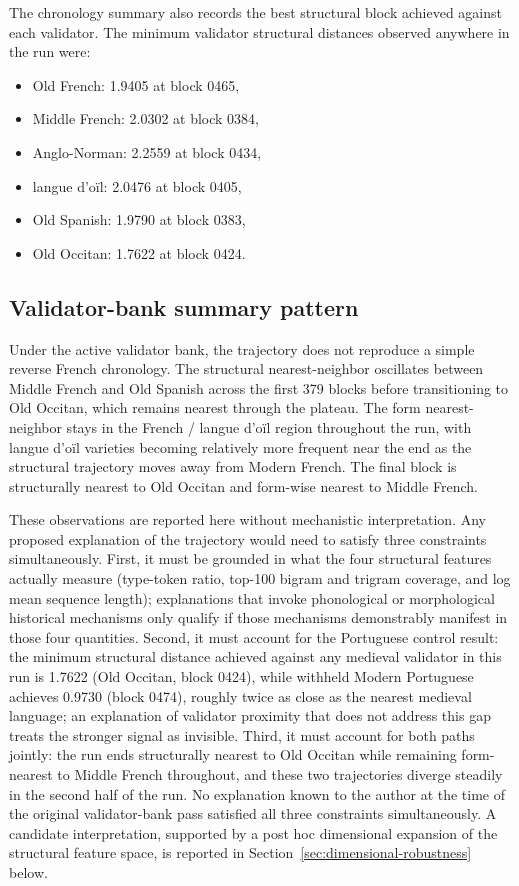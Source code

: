 \documentclass[11pt]{article}
\begin{document}
The chronology summary also records the best structural block achieved against
each validator. The minimum validator structural distances observed anywhere in
the run were:

\begin{itemize}
    \item Old French: 1.9405 at block 0465,
    \item Middle French: 2.0302 at block 0384,
    \item Anglo-Norman: 2.2559 at block 0434,
    \item langue d'o\"il: 2.0476 at block 0405,
    \item Old Spanish: 1.9790 at block 0383,
    \item Old Occitan: 1.7622 at block 0424.
\end{itemize}

\subsection{Validator-bank summary pattern}

Under the active validator bank, the trajectory does not reproduce a simple
reverse French chronology. The structural nearest-neighbor oscillates between
Middle French and Old Spanish across the first 379 blocks before transitioning
to Old Occitan, which remains nearest through the plateau. The form nearest-
neighbor stays in the French / langue d'o\"il region throughout the run,
with langue d'o\"il varieties becoming relatively more frequent near the end
as the structural trajectory moves away from Modern French. The final block is structurally nearest to Old
Occitan and form-wise nearest to Middle French.

These observations are reported here without mechanistic interpretation. Any
proposed explanation of the trajectory would need to satisfy three constraints
simultaneously. First, it must be grounded in what the four structural features
actually measure (type-token ratio, top-100 bigram and trigram coverage, and log
mean sequence length); explanations that invoke phonological or morphological
historical mechanisms only qualify if those mechanisms demonstrably manifest in
those four quantities. Second, it must account for the Portuguese control result:
the minimum structural distance achieved against any medieval validator in this
run is 1.7622 (Old Occitan, block 0424), while withheld Modern Portuguese
achieves 0.9730 (block 0474), roughly twice as close as the nearest medieval
language; an explanation of validator proximity that does not address this gap
treats the stronger signal as invisible. Third, it must account for both paths
jointly: the run ends structurally nearest to Old Occitan while remaining
form-nearest to Middle French throughout, and these two trajectories diverge
steadily in the second half of the run. No explanation known to the author
at the time of the original validator-bank pass satisfied all three constraints
simultaneously. A candidate interpretation, supported by a post hoc dimensional
expansion of the structural feature space, is reported in
Section~\ref{sec:dimensional-robustness} below.
\end{document}
